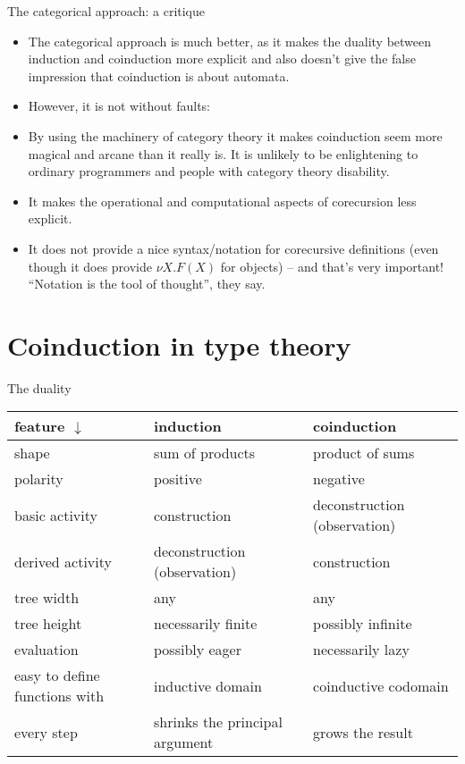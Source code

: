 \documentclass{beamer}
\begin{document}
\begin{frame}{The categorical approach: a critique}
\begin{itemize}
	\item The categorical approach is much better, as it makes the duality between induction and coinduction more explicit and also doesn't give the false impression that coinduction is about automata.
	\item However, it is not without faults:
	\item By using the machinery of category theory it makes coinduction seem more magical and arcane than it really is. It is unlikely to be enlightening to ordinary programmers and people with category theory disability.
	\item It makes the operational and computational aspects of corecursion less explicit.
	\item It does not provide a nice syntax/notation for corecursive definitions (even though it does provide $\nu X. F(X)$ for objects) -- and that's very important! ``Notation is the tool of thought'', they say. 
\end{itemize}
\end{frame}

\section{Coinduction in type theory}

\begin{frame}{The duality}
\begin{tabular}{ | p{3cm} | p{3cm} | p{3cm} | }
	\hline
	feature $\downarrow$ & induction & coinduction \\\hline
	shape & sum of products & product of sums \\\hline
	polarity & positive & negative \\\hline
	basic activity & construction & deconstruction (observation) \\\hline
	derived activity & deconstruction (observation) & construction \\\hline
	tree width & any & any \\\hline
	tree height & necessarily finite & possibly infinite \\\hline
	evaluation & possibly eager & necessarily lazy \\\hline
	easy to define functions with & inductive domain & coinductive codomain \\\hline
	every step & shrinks the principal argument & grows the result \\\hline
\end{tabular}
\end{frame}
\end{document}
